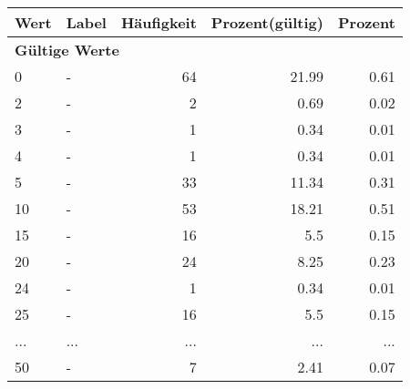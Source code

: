      \begin{longtable}{lXrrr}
     \toprule
     \textbf{Wert} & \textbf{Label} & \textbf{Häufigkeit} & \textbf{Prozent(gültig)} & \textbf{Prozent} \\
     \endhead
     \midrule
     \multicolumn{5}{l}{\textbf{Gültige Werte}}\\
        0 & \multicolumn{1}{X}{-} & %
          \num{64} &
          \num[round-mode=places,round-precision=2]{21,99} &
          \num[round-mode=places,round-precision=2]{0,61} \\
        2 & \multicolumn{1}{X}{-} & %
          \num{2} &
          \num[round-mode=places,round-precision=2]{0,69} &
          \num[round-mode=places,round-precision=2]{0,02} \\
        3 & \multicolumn{1}{X}{-} & %
          \num{1} &
          \num[round-mode=places,round-precision=2]{0,34} &
          \num[round-mode=places,round-precision=2]{0,01} \\
        4 & \multicolumn{1}{X}{-} & %
          \num{1} &
          \num[round-mode=places,round-precision=2]{0,34} &
          \num[round-mode=places,round-precision=2]{0,01} \\
        5 & \multicolumn{1}{X}{-} & %
          \num{33} &
          \num[round-mode=places,round-precision=2]{11,34} &
          \num[round-mode=places,round-precision=2]{0,31} \\
        10 & \multicolumn{1}{X}{-} & %
          \num{53} &
          \num[round-mode=places,round-precision=2]{18,21} &
          \num[round-mode=places,round-precision=2]{0,51} \\
        15 & \multicolumn{1}{X}{-} & %
          \num{16} &
          \num[round-mode=places,round-precision=2]{5,5} &
          \num[round-mode=places,round-precision=2]{0,15} \\
        20 & \multicolumn{1}{X}{-} & %
          \num{24} &
          \num[round-mode=places,round-precision=2]{8,25} &
          \num[round-mode=places,round-precision=2]{0,23} \\
        24 & \multicolumn{1}{X}{-} & %
          \num{1} &
          \num[round-mode=places,round-precision=2]{0,34} &
          \num[round-mode=places,round-precision=2]{0,01} \\
        25 & \multicolumn{1}{X}{-} & %
          \num{16} &
          \num[round-mode=places,round-precision=2]{5,5} &
          \num[round-mode=places,round-precision=2]{0,15} \\
       ... & ... & ... & ... & ... \\
        50 & \multicolumn{1}{X}{-} & %
          \num{7} &
          \num[round-mode=places,round-precision=2]{2,41} &
          \num[round-mode=places,round-precision=2]{0,07} \\


\end{longtable}
